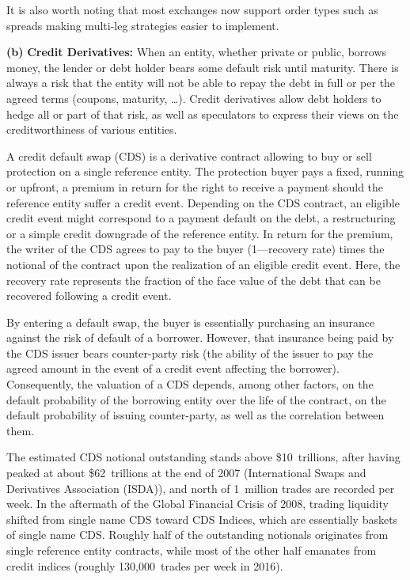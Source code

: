 It is also worth noting that most exchanges now support order types such as spreads making multi-leg strategies easier to implement. \twomedskip


\noindent\textbf{(b)} \textbf{Credit Derivatives:} When an entity, whether private or public, borrows money, the lender or debt holder bears some default risk until maturity. There is always a risk that the entity will not be able to repay the debt in full or per the agreed terms (coupons, maturity, \dots). Credit derivatives allow debt holders to hedge all or part of that risk, as well as speculators to express their views on the creditworthiness of various entities. 


A credit default swap (CDS) is a derivative contract allowing to buy or sell protection on a single reference entity. The protection buyer pays a fixed, running or upfront, a premium in return for the right to receive a payment should the reference entity suffer a credit event. Depending on the CDS contract, an eligible credit event might correspond to a payment default on the debt, a restructuring or a simple credit downgrade of the reference entity. In return for the premium, the writer of the CDS agrees to pay to the buyer (1---recovery rate) times the notional of the contract upon the realization of an eligible credit event. Here, the recovery rate represents the fraction of the face value of the debt that can be recovered following a credit event.


By entering a default swap, the buyer is essentially purchasing an insurance against the risk of default of a borrower. However, that insurance being paid by the CDS issuer bears counter-party risk (the ability of the issuer to pay the agreed amount in the event of a credit event affecting the borrower). Consequently, the valuation of a CDS depends, among other factors, on the default probability of the borrowing entity over the life of the contract, on the default probability of issuing counter-party, as well as the correlation between them.


The estimated CDS notional outstanding stands above \$10~trillions, after having peaked at about \$62~trillions at the end of 2007 (International Swaps and Derivatives Association (ISDA)), and north of 1~million trades are recorded per week. In the aftermath of the Global Financial Crisis of 2008, trading liquidity shifted from single name CDS toward CDS Indices, which are essentially baskets of single name CDS. Roughly half of the outstanding notionals originates from single reference entity contracts, while most of the other half emanates from credit indices (roughly 130,000~trades per week in 2016).


